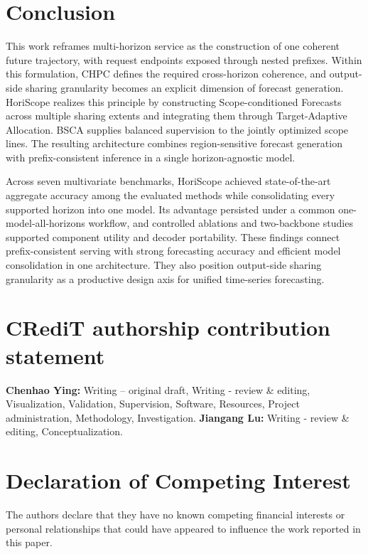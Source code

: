 \documentclass[final,3p,times]{elsarticle}
\begin{document}
\section{Conclusion}
\label{sec:conclusion}


This work reframes multi-horizon service as the construction of one coherent future trajectory, with request endpoints exposed through nested prefixes. Within this formulation, CHPC defines the required cross-horizon coherence, and output-side sharing granularity becomes an explicit dimension of forecast generation. HoriScope realizes this principle by constructing Scope-conditioned Forecasts across multiple sharing extents and integrating them through Target-Adaptive Allocation. BSCA supplies balanced supervision to the jointly optimized scope lines. The resulting architecture combines region-sensitive forecast generation with prefix-consistent inference in a single horizon-agnostic model.

Across seven multivariate benchmarks, HoriScope achieved state-of-the-art aggregate accuracy among the evaluated methods while consolidating every supported horizon into one model. Its advantage persisted under a common one-model-all-horizons workflow, and controlled ablations and two-backbone studies supported component utility and decoder portability. These findings connect prefix-consistent serving with strong forecasting accuracy and efficient model consolidation in one architecture. They also position output-side sharing granularity as a productive design axis for unified time-series forecasting.

\section*{CRediT authorship contribution statement}
\indent \textbf{Chenhao Ying:} Writing -- original draft, Writing - review \& editing, Visualization, Validation, Supervision, Software, Resources, Project administration, Methodology, Investigation. \textbf{Jiangang Lu:} Writing - review \& editing, Conceptualization.

\section*{Declaration of Competing Interest}
\indent The authors declare that they have no known competing financial interests or personal relationships that could have appeared to influence the work reported in this paper.
\end{document}
